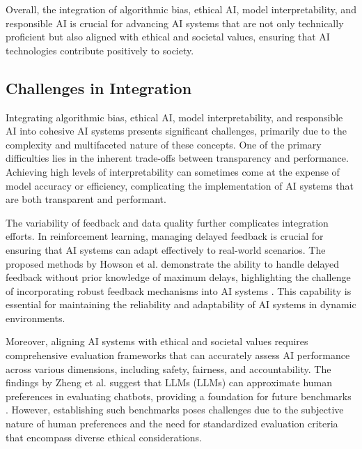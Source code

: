 Overall, the integration of algorithmic bias, ethical AI, model interpretability, and responsible AI is crucial for advancing AI systems that are not only technically proficient but also aligned with ethical and societal values, ensuring that AI technologies contribute positively to society.


\subsection{Challenges in Integration} \label{subsec:Challenges in Integration}

Integrating algorithmic bias, ethical AI, model interpretability, and responsible AI into cohesive AI systems presents significant challenges, primarily due to the complexity and multifaceted nature of these concepts. One of the primary difficulties lies in the inherent trade-offs between transparency and performance. Achieving high levels of interpretability can sometimes come at the expense of model accuracy or efficiency, complicating the implementation of AI systems that are both transparent and performant.



The variability of feedback and data quality further complicates integration efforts. In reinforcement learning, managing delayed feedback is crucial for ensuring that AI systems can adapt effectively to real-world scenarios. The proposed methods by Howson et al. demonstrate the ability to handle delayed feedback without prior knowledge of maximum delays, highlighting the challenge of incorporating robust feedback mechanisms into AI systems \cite{howson2023optimismdelaysepisodicreinforcement}. This capability is essential for maintaining the reliability and adaptability of AI systems in dynamic environments.



Moreover, aligning AI systems with ethical and societal values requires comprehensive evaluation frameworks that can accurately assess AI performance across various dimensions, including safety, fairness, and accountability. The findings by Zheng et al. suggest that LLMs (LLMs) can approximate human preferences in evaluating chatbots, providing a foundation for future benchmarks \cite{zheng2023judging}. However, establishing such benchmarks poses challenges due to the subjective nature of human preferences and the need for standardized evaluation criteria that encompass diverse ethical considerations.



